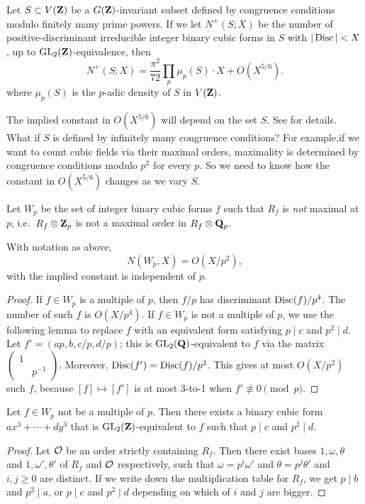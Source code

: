 \begin{theo}
Let $S\subset V(\mathbf{Z})$ be a $G(\mathbf{Z})$-invariant subset defined by congruence 
conditions modulo finitely many prime powers. If we let $N^+(S;X)$ be the 
number of positive-discriminant irreducible integer binary cubic forms in $S$ 
with $|\operatorname{Disc}|<X$, up to $\operatorname{GL}_2(\mathbf{Z})$-equivalence, then 
\[
  N^+(S;X) = \frac{\pi^2}{72} \prod_p\mu_p(S) \cdot X + O(X^{5/6}) .
\]
where $\mu_p(S)$ is the $p$-adic density of $S$ in $V(\mathbf{Z})$. 
\end{theo}

The implied constant in $O(X^{5/6})$ will depend on the set $S$. See 
\cite{bst13} for details. What if $S$ is defined by infinitely many congruence 
conditions? For example,if we want to count cubic fields via their maximal 
orders, maximality is determined by congruence conditions modulo $p^2$ for 
every $p$. So we need to know how the constant in $O(X^{5/6})$ changes as we 
vary $S$. 

Let $W_p$ be the set of integer binary cubic forms $f$ such that $R_f$ is 
\emph{not} maximal at $p$, i.e.~$R_f\otimes\mathbf{Z}_p$ is not a maximal order in 
$R_f\otimes \mathbf{Q}_p$. 

\begin{prop}
With notation as above, 
\[
  N(W_p,X) = O(X/p^2) ,
\]
with the implied constant is independent of $p$. 
\end{prop}
\begin{proof}
If $f\in W_p$ is a multiple of $p$, then $f/p$ has discriminant 
$\operatorname{Disc}(f)/p^4$. The number of such $f$ is $O(X/p^4)$. If $f\in W_p$ is 
not a multiple of $p$, we use the following lemma to replace $f$ with an 
equivalent form satisfying $p\mid c$ and $p^2\mid d$. Let 
$f'=(a p,b,c/p,d/p)$; this is $\operatorname{GL}_2(\mathbf{Q})$-equivalent to $f$ via the 
matrix $\begin{pmatrix} 1 \\ & p^{-1} \end{pmatrix}$. Moreover, 
$\operatorname{Disc}(f') = \operatorname{Disc}(f)/p^2$. This gives at most $O(X/p^2)$ 
such $f$, because $[f]\mapsto [f']$ is at most 3-to-1 when 
$f'\not\equiv 0\pmod p$. 
\end{proof}

\begin{lemm}
Let $f\in W_p$ not be a multiple of $p$. Then there exists a binary cubic 
form $a x^3 + \cdots + d y^3$ that is $\operatorname{GL}_2(\mathbf{Z})$-equivalent to $f$ 
such that $p\mid c$ and $p^2\mid d$. 
\end{lemm}
\begin{proof}
Let $\mathcal{O}$ be an order strictly containing $R_f$. Then there exist bases 
$1,\omega,\theta$ and $1,\omega',\theta'$ of $R_f$ and $\mathcal{O}$ respectively, such 
that $\omega = p^i\omega'$ and $\theta = p^j \theta'$ and $i,j\geqslant 0$ are 
distinct. If we write down the multiplication table for $R_f$, we get 
$p\mid b$ and $p^2\mid a$, or $p\mid c$ and $p^2\mid d$ depending on which of 
$i$ and $j$ are bigger. 
\end{proof}

